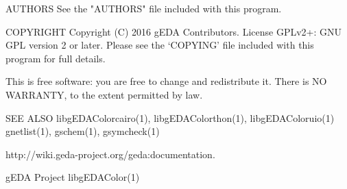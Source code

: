 AUTHORS
       See the "AUTHORS" file included with this program.

COPYRIGHT
       Copyright (C) 2016 gEDA Contributors. License GPLv2+: GNU GPL
       version 2 or later. Please see the `COPYING' file included with this
       program for full details.

       This is free software: you are free to change and redistribute it.
       There is NO WARRANTY, to the extent permitted by law.

SEE ALSO
       libgEDAColorcairo(1),      libgEDAColorthon(1),      libgEDAColoruio(1)
       gnetlist(1), gschem(1), gsymcheck(1)

       http://wiki.geda-project.org/geda:documentation.



gEDA Project                                                   libgEDAColor(1)
